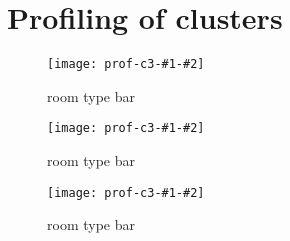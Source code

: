 
\section{Profiling of clusters}%
\label{sec:profiling_of_clusters}

\newcommand{\profiling}[3]{
\begin{figure}[H]
    \centering
    \texttt{[image: prof-c3-\#1-\#2]}
    \caption{#3}%
    \label{fig:#1-#2}
\end{figure}
}

\profiling{room_type}{percent}{room type bar}
\profiling{room_type}{side}{room type bar}
\profiling{room_type}{stack}{room type bar}




